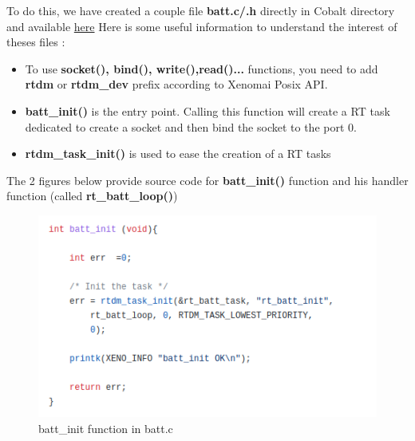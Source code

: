 \documentclass[12pt,hidelinks]{article}
\begin{document}
{        To do this, we have created a couple file \textbf{batt.c/.h} directly in Cobalt directory and available \href{https://github.com/skyultime/Xenomai-EDH/blob/final_version/kernel/cobalt/batt.c}{here}
        Here is some useful information to understand the interest of theses files :
        \begin{itemize}
            \item To use \textbf{socket(), bind(), write(),read()...} functions, you need to add \textbf{rtdm} or \textbf{rtdm\_dev} prefix according to Xenomai Posix API.
            \item \textbf{batt\_init()} is the entry point. Calling this function will create a RT task dedicated to create a socket and then bind the socket to the port 0.
            \item \textbf{rtdm\_task\_init()} is used to ease the creation of a RT tasks
        \end{itemize}
        
        The 2 figures below provide source code for \textbf{batt\_init()} function and his handler function (called 
        \textbf{rt\_batt\_loop()})
        
	    \newpage \begin{figure}[ht]
        \centering
    	\includegraphics[scale=0.9]{battInit.png}
    	\caption{batt\_init function in batt.c}
    	\end{figure} \newline
    	
}
\end{document}
